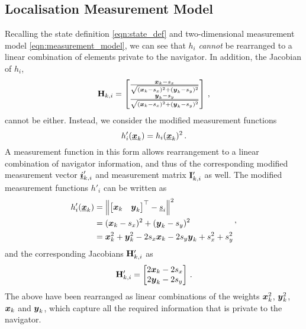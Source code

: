 \documentclass[twocolumn]{autart}
\begin{document}
\subsection{Localisation Measurement Model} \label{subsec:observation_model}
Recalling the state definition \eqref{eqn:state_def} and two-dimensional measurement model \eqref{eqn:measurement_model}, we can see that $h_i$ \textit{cannot} be rearranged to a linear combination of elements private to the navigator. In addition, the Jacobian of $h_i$,
\begin{equation}
    {\ensuremath{{\mathbf{H}}}}_{k,i} = 
    \begin{bmatrix}
        \frac{{\boldsymbol{x}}_k - s_x}{\sqrt{({\boldsymbol{x}}_k - s_x)^2 + ({\boldsymbol{y}}_k - s_y)^2}} \\
        \frac{{\boldsymbol{y}}_k - s_y}{\sqrt{({\boldsymbol{x}}_k - s_x)^2 + ({\boldsymbol{y}}_k - s_y)^2}} 
    \end{bmatrix}\,,
\end{equation}
cannot be either. Instead, we consider the modified measurement functions
\begin{equation}
    h'_i({\boldsymbol{\underline{x}}}_k) = h_i({\boldsymbol{\underline{x}}}_k)^2\,. \label{eqn:modified_measurement_func}
\end{equation}
A measurement function in this form allows rearrangement to a linear combination of navigator information, and thus of the corresponding modified measurement vector ${\boldsymbol{\underline{i}}}'_{k,i}$ and measurement matrix ${{\mathbf{I}}}'_{k,i}$ as well. The modified measurement functions $h'_i$ can be written as
\begin{equation}
    \begin{split}
        h'_i({\boldsymbol{\underline{x}}}_k) &= \left\lVert
        \begin{bmatrix}
            {\boldsymbol{x}}_k & {\boldsymbol{y}}_k
        \end{bmatrix}^\top - {\underline{s}}_i\right\rVert^2 \\
        &= ({\boldsymbol{x}}_k - s_x)^2 + ({\boldsymbol{y}}_k - s_y)^2 \\
        &= {\boldsymbol{x}}_k^2 + {\boldsymbol{y}}_k^2 -2s_x{\boldsymbol{x}}_k -2s_y{\boldsymbol{y}}_k +s_x^2 +s_y^2
    \end{split}\,,
\end{equation}
and the corresponding Jacobians ${{\mathbf{H}}}'_{k,i}$ as
\begin{equation}
    {\ensuremath{{\mathbf{H}}}}'_{k,i} = 
    \begin{bmatrix}
        2{\boldsymbol{x}}_k - 2s_x \\
        2{\boldsymbol{y}}_k - 2s_y
    \end{bmatrix}\,.
\end{equation}
The above have been rearranged as linear combinations of the weights ${\boldsymbol{x}}_k^2$, ${\boldsymbol{y}}_k^2$, ${\boldsymbol{x}}_k$ and ${\boldsymbol{y}}_k$, which capture all the required information that is private to the navigator. 
\end{document}
